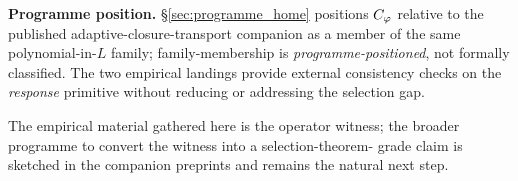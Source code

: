 \textbf{Programme position.} \S\ref{sec:programme_home} positions
$C_{\varphi}$ relative to the published adaptive-closure-transport
companion as a member of the same polynomial-in-$L$ family;
family-membership is \emph{programme-positioned}, not formally
classified. The two empirical landings provide external
consistency checks on the \emph{response} primitive without
reducing or addressing the selection gap.

The empirical material gathered here is the operator witness; the
broader programme to convert the witness into a selection-theorem-
grade claim is sketched in the companion preprints and remains
the natural next step.

